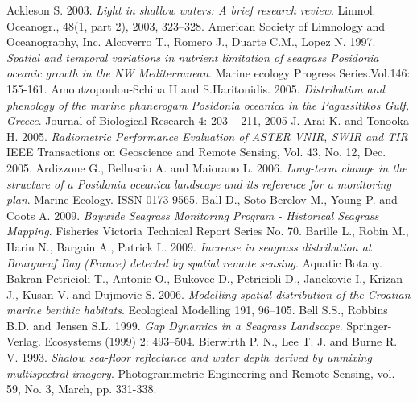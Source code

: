 \documentclass[10pt, a4paper]{article}
\begin{document}
\begin{thebibliography}{999}


Ackleson S. 2003. \emph{Light in shallow waters: A brief research review}. Limnol. Oceanogr.,
48(1, part 2), 2003, 323–328. American Society of Limnology and Oceanography, Inc. \pageref{Ackleson, 2003}
Alcoverro T., Romero J., Duarte C.M., Lopez N. 1997. \emph{Spatial and temporal variations
in nutrient limitation of seagrass Posidonia oceanic growth in the NW Mediterranean}.
Marine ecology Progress Series.Vol.146: 155-161. \pageref{}
Amoutzopoulou-Schina H and S.Haritonidis. 2005. \emph{Distribution and phenology of the
marine phanerogam \textit{Posidonia oceanica} in the Pagassitikos Gulf, Greece}. Journal of
Biological Research 4: 203 – 211, 2005 J. \pageref{Amoutzopoulou-Schina05}
Arai K. and Tonooka H. 2005. \emph{Radiometric Performance Evaluation of ASTER VNIR, SWIR and TIR} 
IEEE Transactions on Geoscience and Remote Sensing, Vol. 43, No. 12, Dec. 2005. \pageref{Arai05}
Ardizzone G., Belluscio A. and Maiorano L. 2006. \emph{Long-term change in the structure of
a \textit{Posidonia oceanica} landscape and its reference for a monitoring plan}. Marine Ecology.
ISSN 0173-9565. \pageref{Ardizzone06}
Ball D., Soto-Berelov M., Young P. and Coots A. 2009. \emph{Baywide Seagrass Monitoring
Program - Historical Seagrass Mapping}. Fisheries Victoria Technical Report Series No. 70. \pageref{Ball09}
Barille L., Robin M., Harin N., Bargain A., Patrick L. 2009. \emph{Increase in seagrass
distribution at Bourgneuf Bay (France) detected by spatial remote sensing}. Aquatic Botany. \pageref{Barille09}
Bakran-Petricioli T., Antonic O., Bukovec D., Petricioli D., Janekovic I., Krizan J.,
Kusan V. and Dujmovic S. 2006. \emph{Modelling spatial distribution of the Croatian marine
benthic habitats}. Ecological Modelling 191, 96–105. \pageref{Bakran-Petricioli06}
Bell S.S., Robbins B.D. and Jensen S.L. 1999. \emph{Gap Dynamics in a Seagrass Landscape}.
Springer-Verlag. Ecosystems (1999) 2: 493–504. \pageref{Bell99}
Bierwirth P. N., Lee T. J. and Burne R. V. 1993. \emph{Shalow sea-floor reflectance and water
depth derived by unmixing multispectral imagery}. Photogrammetric Engineering and Remote
Sensing, vol. 59, No. 3, March, pp. 331-338. \pageref{Bierwirth93}

\end{thebibliography}
\end{document}
